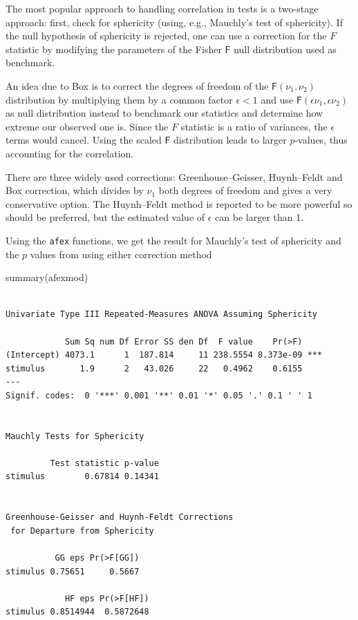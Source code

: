 \documentclass[
  11pt,
  letterpaper,
]{scrbook}
\newenvironment{Shaded}{\begin{snugshade}}{\end{snugshade}}
\newcommand{\FunctionTok}[1]{\textcolor[rgb]{0.28,0.35,0.67}{#1}}
\newcommand{\NormalTok}[1]{\textcolor[rgb]{0.00,0.23,0.31}{#1}}
\theoremstyle{definition}
\theoremstyle{definition}
\theoremstyle{remark}
\begin{document}
The most popular approach to handling correlation in tests is a
two-stage approach: first, check for sphericity (using, e.g., Mauchly's
test of sphericity). If the null hypothesis of sphericity is rejected,
one can use a correction for the \(F\) statistic by modifying the
parameters of the Fisher \(\mathsf{F}\) null distribution used as
benchmark.

An idea due to Box is to correct the degrees of freedom of the
\(\mathsf{F}(\nu_1, \nu_2)\) distribution by multiplying them by a
common factor \(\epsilon<1\) and use
\(\mathsf{F}(\epsilon\nu_1, \epsilon\nu_2)\) as null distribution
instead to benchmark our statistics and determine how extreme our
observed one is. Since the \(F\) statistic is a ratio of variances, the
\(\epsilon\) terms would cancel. Using the scaled \(\mathsf{F}\)
distribution leads to larger \(p\)-values, thus accounting for the
correlation.

There are three widely used corrections: Greenhouse--Geisser,
Huynh--Feldt and Box correction, which divides by \(\nu_1\) both degrees
of freedom and gives a very conservative option. The Huynh--Feldt method
is reported to be more powerful so should be preferred, but the
estimated value of \(\epsilon\) can be larger than 1.

Using the \texttt{afex} functions, we get the result for Mauchly's test
of sphericity and the \(p\) values from using either correction method

\begin{Shaded}
\begin{Highlighting}[]
\FunctionTok{summary}\NormalTok{(afexmod)}
\end{Highlighting}
\end{Shaded}

\begin{verbatim}

Univariate Type III Repeated-Measures ANOVA Assuming Sphericity

            Sum Sq num Df Error SS den Df  F value    Pr(>F)    
(Intercept) 4073.1      1  187.814     11 238.5554 8.373e-09 ***
stimulus       1.9      2   43.026     22   0.4962    0.6155    
---
Signif. codes:  0 '***' 0.001 '**' 0.01 '*' 0.05 '.' 0.1 ' ' 1


Mauchly Tests for Sphericity

         Test statistic p-value
stimulus        0.67814 0.14341


Greenhouse-Geisser and Huynh-Feldt Corrections
 for Departure from Sphericity

          GG eps Pr(>F[GG])
stimulus 0.75651     0.5667

            HF eps Pr(>F[HF])
stimulus 0.8514944  0.5872648
\end{verbatim}
\end{document}
